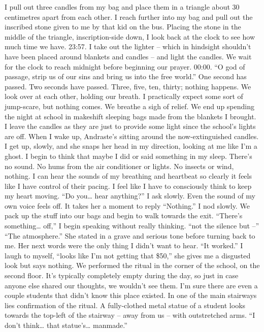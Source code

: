 \documentclass[a4paper, 12pt]{book}
\newcommand\tab[1][1cm]{\hspace*{#1}}
\begin{document}
\newline
\tab
I pull out three candles from my bag and place them in a triangle about 30 centimetres apart from each other. I reach further into my bag and pull out the inscribed stone given to me by that kid on the bus. Placing the stone in the middle of the triangle, inscription-side down, I look back at the clock to see how much time we have. 23:57. I take out the lighter – which in hindsight shouldn’t have been placed around blankets and candles – and light the candles. We wait for the clock to reach midnight before beginning our prayer. 00:00. “O god of passage, strip us of our sins and bring us into the free world.” One second has passed. Two seconds have passed. Three, five, ten, thirty; nothing happens. We look over at each other, holding our breath. I practically expect some sort of jump-scare, but nothing comes. We breathe a sigh of relief. We end up spending the night at school in makeshift sleeping bags made from the blankets I brought. I leave the candles as they are just to provide some light since the school’s lights are off.
\newline
\tab
When I wake up, Andraste’s sitting around the now-extinguished candles. I get up, slowly, and she snaps her head in my direction, looking at me like I’m a ghost. I begin to think that maybe I did or said something in my sleep.
\newline
\tab
There’s no sound. No hums from the air conditioner or lights. No insects or wind, nothing. I can hear the sounds of my breathing and heartbeat so clearly it feels like I have control of their pacing. I feel like I have to consciously think to keep my heart moving. “Do you… hear anything?” I ask slowly. Even the sound of my own voice feels off.
\newline
\tab
It takes her a moment to reply “Nothing.” I nod slowly.
\newline
\tab
We pack up the stuff into our bags and begin to walk towards the exit. “There’s something… off,” I begin speaking without really thinking. “not the silence but –”
\newline
\tab
“The atmosphere.” She stated in a grave and serious tone before turning back to me. Her next words were the only thing I didn’t want to hear. “It worked.”
\newline
\tab
I laugh to myself, “looks like I’m not getting that \$50,” she gives me a disgusted look but says nothing.
\newline
\tab
We performed the ritual in the corner of the school, on the second floor. It’s typically completely empty during the day, so just in case anyone else shared our thoughts, we wouldn’t see them. I’m sure there are even a couple students that didn’t know this place existed. In one of the main stairways lies confirmation of the ritual. A fully-clothed metal statue of a student looks towards the top-left of the stairway – away from us – with outstretched arms. “I don’t think… that statue’s… manmade.”
\end{document}
